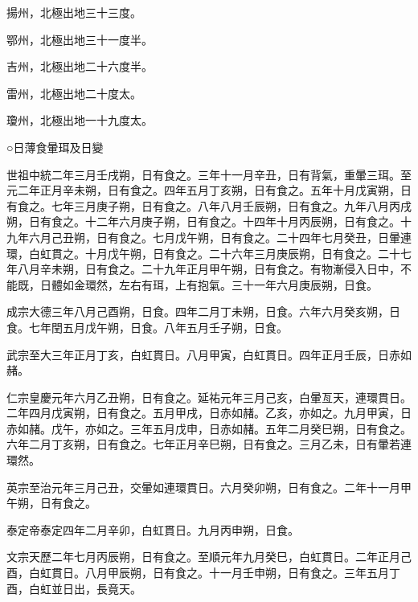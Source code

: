 \begin{pinyinscope}
 揚州，北極出地三十三度。



 鄂州，北極出地三十一度半。



 吉州，北極出地二十六度半。



 雷州，北極出地二十度太。



 瓊州，北極出地一十九度太。



 ○日薄食暈珥及日變



 世祖中統二年三月壬戌朔，日有食之。三年十一月辛丑，日有背氣，重暈三珥。至元二年正月辛未朔，日有食之。四年五月丁亥朔，日有食之。五年十月戊寅朔，日有食之。七年三月庚子朔，日有食之。八年八月壬辰朔，日有食之。九年八月丙戌朔，日有食之。十二年六月庚子朔，日有食之。十四年十月丙辰朔，日有食之。十九年六月己丑朔，日有食之。七月戊午朔，日有食之。二十四年七月癸丑，日暈連環，白虹貫之。十月戊午朔，日有食之。二十六年三月庚辰朔，日有食之。二十七年八月辛未朔，日有食之。二十九年正月甲午朔，日有食之。有物漸侵入日中，不能既，日體如金環然，左右有珥，上有抱氣。三十一年六月庚辰朔，日食。



 成宗大德三年八月己酉朔，日食。四年二月丁未朔，日食。六年六月癸亥朔，日食。七年閏五月戊午朔，日食。八年五月壬子朔，日食。



 武宗至大三年正月丁亥，白虹貫日。八月甲寅，白虹貫日。四年正月壬辰，日赤如赭。



 仁宗皇慶元年六月乙丑朔，日有食之。延祐元年三月己亥，白暈亙天，連環貫日。二年四月戊寅朔，日有食之。五月甲戌，日赤如赭。乙亥，亦如之。九月甲寅，日赤如赭。戊午，亦如之。三年五月戊申，日赤如赭。五年二月癸巳朔，日有食之。六年二月丁亥朔，日有食之。七年正月辛巳朔，日有食之。三月乙未，日有暈若連環然。



 英宗至治元年三月己丑，交暈如連環貫日。六月癸卯朔，日有食之。二年十一月甲午朔，日有食之。



 泰定帝泰定四年二月辛卯，白虹貫日。九月丙申朔，日食。



 文宗天歷二年七月丙辰朔，日有食之。至順元年九月癸巳，白虹貫日。二年正月己酉，白虹貫日。八月甲辰朔，日有食之。十一月壬申朔，日有食之。三年五月丁酉，白虹並日出，長竟天。




\end{pinyinscope}
